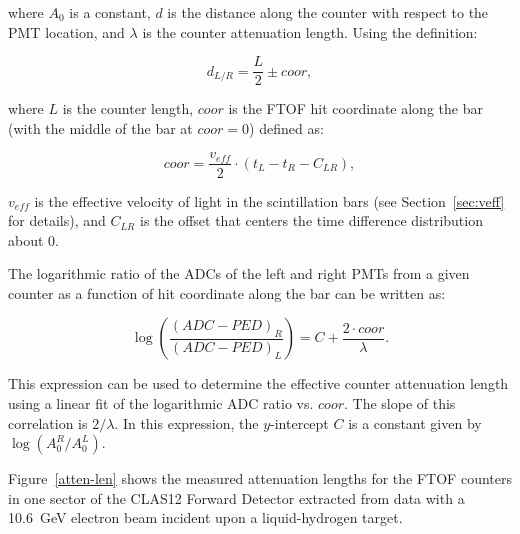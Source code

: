 \documentclass[3p,times,twocolumn]{elsarticle}
\begin{document}
\noindent
where $A_0$ is a constant, $d$ is the distance along the counter with respect to the PMT location, and
$\lambda$ is the counter attenuation length. Using the definition:

\begin{equation}
  d_{L/R} = \frac{L}{2} \pm coor,
\end{equation}

\noindent
where $L$ is the counter length, $coor$ is the FTOF hit coordinate along the bar (with the middle of the bar
at $coor=0$) defined as:

\begin{equation}
\label{coor}
coor = \frac{v_{eff}}{2} \cdot (t_L - t_R - C_{LR}),
\end{equation}

\noindent
$v_{eff}$ is the effective velocity of light in the scintillation bars (see Section~\ref{sec:veff} for details), and
$C_{LR}$ is the offset that centers the time difference distribution about 0.

The logarithmic ratio of the ADCs of the left and right PMTs from a given counter as a function of hit coordinate
along the bar can be written as:

\begin{equation}
\label{linear}
\log \left( \frac{(ADC-PED)_R}{(ADC-PED)_L} \right ) = C + \frac{2 \cdot coor}{\lambda}.
\end{equation}

\noindent
This expression can be used to determine the effective counter attenuation length using a linear fit of the
logarithmic ADC ratio vs. $coor$. The slope of this correlation is $2/\lambda$. In this expression, the
$y$-intercept $C$ is a constant given by $\log(A_0^R/A_0^L)$.

Figure~\ref{atten-len} shows the measured attenuation lengths for the FTOF counters in one sector of
the CLAS12 Forward Detector extracted from data with a 10.6~GeV electron beam incident upon a
liquid-hydrogen target.
\end{document}
